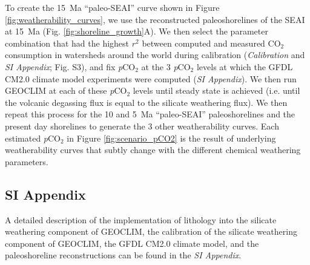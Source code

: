 \documentclass[9pt,twocolumn,twoside,lineno]{pnas-new}
\newcommand{\pCOtwo}{\textit{p}CO$_{2}$\xspace}
\newcommand{\COtwo}{CO$_{2}$\xspace}
\newcommand{\SI}{\textit{SI Appendix}\xspace}
\begin{document}
{To create the 15~Ma ``paleo-SEAI'' curve shown in Figure \ref{fig:weatherability_curves}, we use the reconstructed paleoshorelines of the SEAI at 15~Ma (Fig. \ref{fig:shoreline_growth}A). We then select the parameter combination that had the highest $r^{2}$ between computed and measured \COtwo consumption in watersheds around the world during calibration (\textit{Calibration} and \SI; Fig. S3), and fix \pCOtwo at the 3 \pCOtwo levels at which the GFDL CM2.0 climate model experiments were computed (\SI). We then run GEOCLIM at each of these \pCOtwo levels until steady state is achieved (i.e. until the volcanic degassing flux is equal to the silicate weathering flux). We then repeat this process for the 10 and 5~Ma ``paleo-SEAI'' paleoshorelines and the present day shorelines to generate the 3 other weatherability curves. Each estimated \pCOtwo in Figure \ref{fig:scenario_pCO2} is the result of underlying weatherability curves that subtly change with the different chemical weathering parameters.

\subsection*{SI Appendix}

A detailed description of the implementation of lithology into the silicate weathering component of GEOCLIM, the calibration of the silicate weathering component of GEOCLIM, the GFDL CM2.0 climate model, and the paleoshoreline reconstructions can be found in the \SI.
}

\showmatmethods{} %


\showacknow{} %


\end{document}
